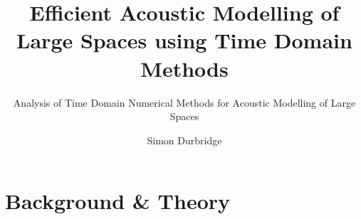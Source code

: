 \documentclass[graybox,envcountchap,sectrefs]{svmono}
\begin{document}
\author{Simon Durbridge} %

\title{Efficient Acoustic Modelling of Large Spaces using Time Domain Methods} %

\subtitle{Analysis of Time Domain Numerical Methods for Acoustic Modelling of Large Spaces}
\maketitle

\frontmatter%


%
%


\tableofcontents


\mainmatter%
\part{Background \& Theory}
%


\backmatter%
%
%
\printindex

\end{document}
